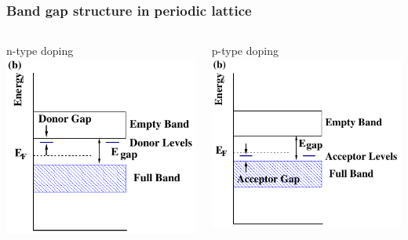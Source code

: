 \documentclass[beamer]{standalone}
\begin{document}
\begin{frame}[t]
 \frametitle{Band gap structure in periodic lattice}
 \begin{columns}[t]
  \begin{column}{0.47\textwidth}
   \begin{block}{n-type doping}
    \includegraphics[width=\textwidth]{pics/bands_n}
   \end{block}
  \end{column}
  \begin{column}{0.49\textwidth}
   \begin{block}{p-type doping}
    \includegraphics[width=\textwidth]{pics/bands_p}
   \end{block}
  \end{column}
 \end{columns}
\end{frame}
\end{document}

